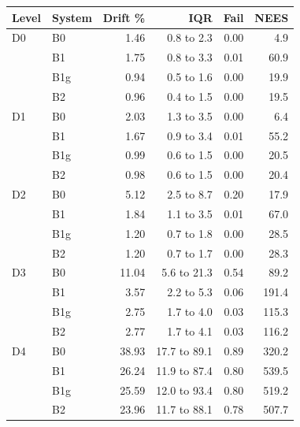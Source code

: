 \begin{tabular}{llrrrr}
\toprule
Level & System & Drift \% & IQR & Fail & NEES \\
\midrule
D0 & B0 & 1.46 & 0.8 to 2.3 & 0.00 & 4.9 \\
 & B1 & 1.75 & 0.8 to 3.3 & 0.01 & 60.9 \\
 & B1g & 0.94 & 0.5 to 1.6 & 0.00 & 19.9 \\
 & B2 & 0.96 & 0.4 to 1.5 & 0.00 & 19.5 \\
\midrule
D1 & B0 & 2.03 & 1.3 to 3.5 & 0.00 & 6.4 \\
 & B1 & 1.67 & 0.9 to 3.4 & 0.01 & 55.2 \\
 & B1g & 0.99 & 0.6 to 1.5 & 0.00 & 20.5 \\
 & B2 & 0.98 & 0.6 to 1.5 & 0.00 & 20.4 \\
\midrule
D2 & B0 & 5.12 & 2.5 to 8.7 & 0.20 & 17.9 \\
 & B1 & 1.84 & 1.1 to 3.5 & 0.01 & 67.0 \\
 & B1g & 1.20 & 0.7 to 1.8 & 0.00 & 28.5 \\
 & B2 & 1.20 & 0.7 to 1.7 & 0.00 & 28.3 \\
\midrule
D3 & B0 & 11.04 & 5.6 to 21.3 & 0.54 & 89.2 \\
 & B1 & 3.57 & 2.2 to 5.3 & 0.06 & 191.4 \\
 & B1g & 2.75 & 1.7 to 4.0 & 0.03 & 115.3 \\
 & B2 & 2.77 & 1.7 to 4.1 & 0.03 & 116.2 \\
\midrule
D4 & B0 & 38.93 & 17.7 to 89.1 & 0.89 & 320.2 \\
 & B1 & 26.24 & 11.9 to 87.4 & 0.80 & 539.5 \\
 & B1g & 25.59 & 12.0 to 93.4 & 0.80 & 519.2 \\
 & B2 & 23.96 & 11.7 to 88.1 & 0.78 & 507.7 \\
\bottomrule
\end{tabular}